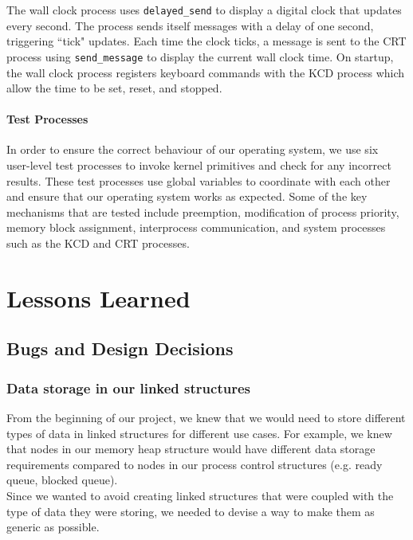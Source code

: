 \documentclass[12pt]{report}
\begin{document}
The wall clock process uses \texttt{delayed_send} to display a digital clock that updates every second. The process sends itself messages with a delay of one second,
triggering ``tick" updates. Each time the clock ticks, a message is sent to the CRT process using \texttt{send_message} to display the current wall clock time. On startup, the wall clock process registers keyboard commands with the KCD process which allow the time to be set, reset, and stopped.

\subsection{Test Processes}

In order to ensure the correct behaviour of our operating system, we use six user-­level test processes to invoke kernel primitives and check for any incorrect results. These test processes use global variables to coordinate with each other and ensure that  our operating system works as expected. Some of the key mechanisms that are tested include preemption, modification of process priority, memory block assignment, interprocess communication, and system processes such as the KCD and CRT processes.

\part{Lessons Learned}

\chapter{Bugs and Design Decisions}

\section{Data storage in our linked structures}

From the beginning of our project, we knew that we would need to store different types of data in linked structures for different use cases. For example, we knew that nodes in our memory heap structure would have different data storage requirements compared to nodes in our process control structures (e.g. ready queue, blocked queue).\\

Since we wanted to avoid creating linked structures that were coupled with the type of data they were storing, we needed to devise a way to make them as generic as possible.\\
\end{document}
